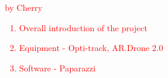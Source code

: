 \textcolor{red}{ 
by Cherry
\begin{enumerate}
	\item Overall introduction of the project
	\item Equipment - Opti-track, AR.Drone 2.0
	\item Software - Paparazzi
\end{enumerate}
}